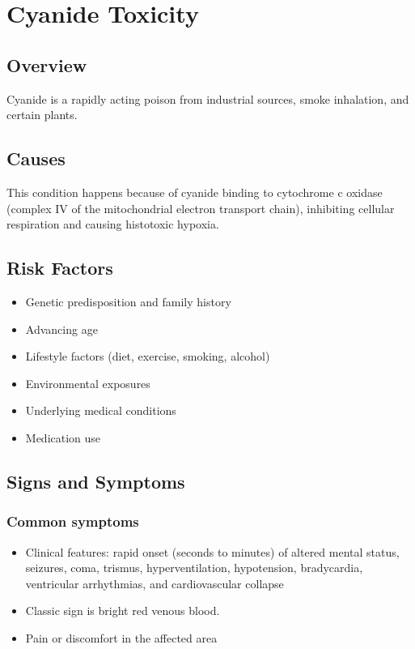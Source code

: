\chapter{Cyanide Toxicity}
\label{sec:Cyanide Toxicity}

\section{Overview}
Cyanide is a rapidly acting poison from industrial sources, smoke inhalation, and certain plants.
\section{Causes}
This condition happens because of cyanide binding to cytochrome c oxidase (complex IV of the mitochondrial electron transport chain), inhibiting cellular respiration and causing histotoxic hypoxia.     
\section{Risk Factors}

\begin{itemize}[noitemsep]
  \item Genetic predisposition and family history
  \item Advancing age
  \item Lifestyle factors (diet, exercise, smoking, alcohol)
  \item Environmental exposures
  \item Underlying medical conditions
  \item Medication use
\end{itemize}
\section{Signs and Symptoms}

\subsection{Common symptoms}
\begin{itemize}[noitemsep]
  \item Clinical features: rapid onset (seconds to minutes) of altered mental status, seizures, coma, trismus, hyperventilation, hypotension, bradycardia, ventricular arrhythmias, and cardiovascular collapse
  \item Classic sign is bright red venous blood.
  \item Pain or discomfort in the affected area
  \end{itemize}

